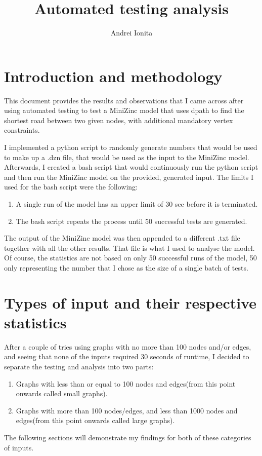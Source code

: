 \documentclass{article}
\title{Automated testing analysis}
\author{Andrei Ionita}
\begin{document}
\maketitle

\section{Introduction and methodology}
This document provides the results and observations that I came across after using automated testing to test 
a MiniZinc model that uses dpath to find the shortest road between two given nodes, with additional mandatory vertex
constraints.


I implemented a python script to randomly generate numbers that would be used to make up a .dzn file, that would be used
as the input to the MiniZinc model. Afterwards, I created a bash script that would continuously run the python script and then
run the MiniZinc model on the provided, generated input. The limits I used for the bash script were the following:
\begin{enumerate}
    \item A single run of the model has an upper limit of 30 sec before it is terminated.
    \item The bash script repeats the process until 50 successful tests are generated.
\end{enumerate}
The output of the MiniZinc model was then appended to a different .txt file together with all the other results.
That file is what I used to analyse the model. Of course, the statistics are not based on only 50 successful runs of 
the model, 50 only representing the number that I chose as the size of a single batch of tests.

\section{Types of input and their respective statistics}
After a couple of tries using graphs with no more than 100 nodes and/or edges, and seeing that none of the inputs required
30 seconds of runtime, I decided to separate the testing and analysis into two parts: 
\begin{enumerate}
    \item Graphs with less than or equal to 100 nodes and edges(from this point onwards called small graphs).
    \item Graphs with more than 100 nodes/edges, and less than 1000 nodes and edges(from this point onwards called large graphs).
\end{enumerate}
The following sections will demonstrate my findings for both of these categories of inputs.
\end{document}
